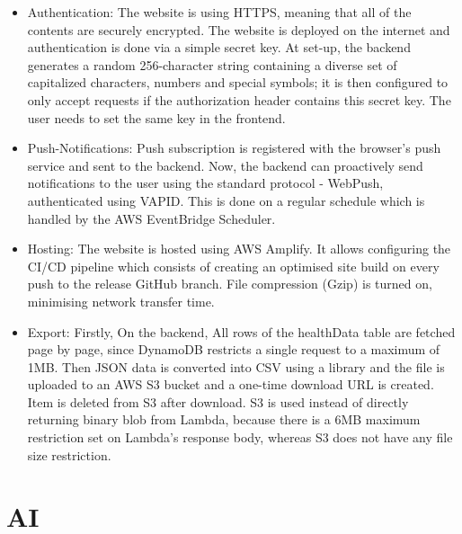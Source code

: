 \begin{itemize}
    \item {Authentication: The website is using HTTPS, meaning that all of the contents are securely encrypted. The website is deployed on the internet and authentication is done via a simple secret key. At set-up, the backend generates a random 256-character string containing a diverse set of capitalized characters, numbers and special symbols; it is then configured to only accept requests if the authorization header contains this secret key. The user needs to set the same key in the frontend.}
    \item {Push-Notifications: Push subscription is registered with the browser's push service and sent to the backend. Now, the backend can proactively send notifications to the user using the standard protocol - WebPush, authenticated using VAPID. This is done on a regular schedule which is handled by the AWS EventBridge Scheduler. }
    \item {Hosting: The website is hosted using AWS Amplify. It allows configuring the CI/CD pipeline which consists of creating an optimised site build on every push to the release GitHub branch. File compression (Gzip) is turned on, minimising network transfer time. }
    \item {Export: Firstly, On the backend, All rows of the healthData table are fetched page by page, since DynamoDB restricts a single request to a maximum of 1MB. Then JSON data is converted into CSV using a library and the file is uploaded to an AWS S3 bucket and a one-time download URL is created. Item is deleted from S3 after download. S3 is used instead of directly returning binary blob from Lambda, because there is a 6MB maximum restriction set on Lambda's response body, whereas S3 does not have any file size restriction. }
\end{itemize}
\section{AI}
